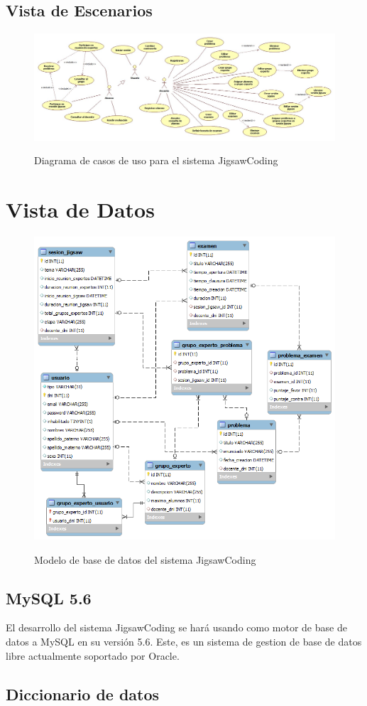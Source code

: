 \begin{landscape}
\section{Vista de Escenarios}
\begin{figure}[!h]
  \centering
  \includegraphics[scale=0.45]{figuras/casosdeuso/casos_de_uso.jpg}\\
  \caption[Casos de uso]{Diagrama de casos de uso para el sistema JigsawCoding}
  \label{fig:casos_de_uso}
\end{figure}
\end{landscape}
\clearpage
\section{Vista de Datos}
\begin{figure}[!h]
  \centering
  \includegraphics[scale=0.6]{figuras/sad/modelo_de_datos.png}\\
  \caption[Modelo de datos]{Modelo de base de datos del sistema JigsawCoding}\label{fig:modelo_de_datos}
\end{figure}
\subsection{MySQL 5.6}
El desarrollo del sistema JigsawCoding se hará usando como motor de base de datos a MySQL en su versión 5.6. Este, es un sistema de gestion de base de datos libre actualmente soportado por Oracle. 
\subsection{Diccionario de datos}